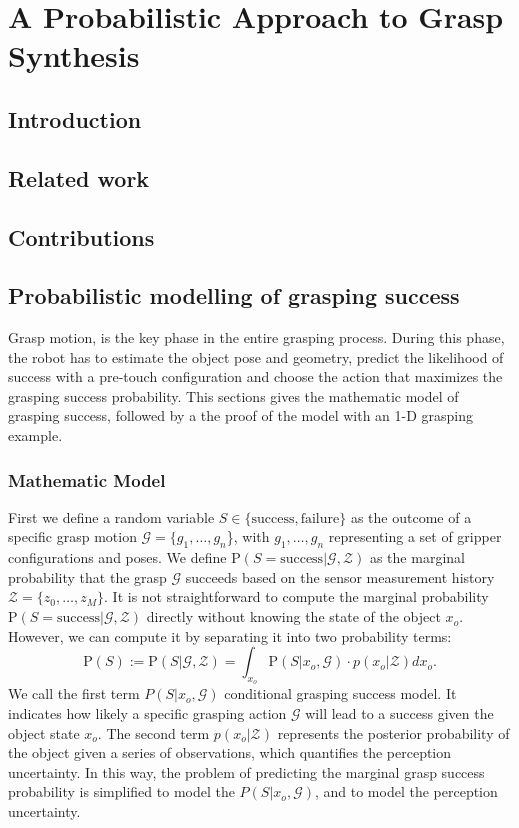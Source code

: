 \chapter{A Probabilistic Approach to Grasp Synthesis}

\section{Introduction}

\section{Related work}

\section{Contributions}

\section{Probabilistic modelling of grasping success}
Grasp motion, is the key phase
in the entire grasping process. During this phase, the robot has to estimate the object pose and geometry, predict the likelihood of success with a pre-touch configuration and choose the action that maximizes the
grasping success probability. This sections gives the mathematic model of grasping success, followed by a the proof of the model with an 1-D grasping example. 
\subsection{Mathematic Model}
First we define a random variable $S \in \{ \text{success} , \text{failure} \}$ as the outcome of a specific grasp motion $\mathcal{G} = \{g_1, \dots ,g_n$\}, with $g_1, \dots ,g_n$ representing a set of gripper configurations and poses. We define $\text{P}({S = \text{success}}|\mathcal{G},\mathcal{Z})$ as the marginal probability that the grasp $\mathcal{G}$ succeeds based on the sensor measurement history $\mathcal{Z}=\lbrace z_0, \dots ,z_M \rbrace$. It is not straightforward to compute the marginal probability $\text{P}({S = \text{success}}|\mathcal{G},\mathcal{Z})$ directly without knowing the state of the object 
$x_o$. However, we can compute it by separating it into two probability terms: 
\begin{equation}
\text{P}(S) := \text{P}(S | \mathcal{G} ,\mathcal{Z}) = \int_{x_o} \text{P} (S | x_o,\mathcal{G} )\cdot p(x_o|\mathcal{Z}) dx_o. 
\label{e_grasp_success}
\end{equation}
We call the first term $P(S | x_o,\mathcal{G})$ conditional grasping success model. It indicates how likely a specific grasping action $\mathcal{G}$ will lead to a success given the object state $x_o$. The second term $p(x_o|\mathcal{Z})$ represents the posterior probability of the object given a series of observations, which quantifies the perception uncertainty. In this way, the problem of predicting the marginal grasp success probability is simplified to model the $P(S | x_o,\mathcal{G})$, and to model the perception uncertainty. 

